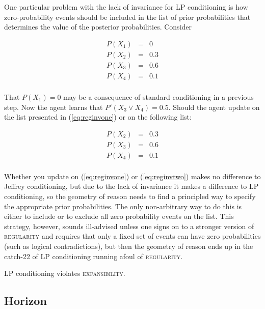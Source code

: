 \documentclass[12pt]{article}
\begin{document}
One particular problem with the lack of invariance for LP conditioning
is how zero-probability events should be included in the list of prior
probabilities that determines the value of the posterior
probabilities. Consider

\begin{equation}
  \label{eq:reginvone}
  \begin{array}{rcl}
  P(X_{1})&=&0\\
  P(X_{2})&=&0.3\\
  P(X_{3})&=&0.6\\
  P(X_{4})&=&0.1\\
\end{array}
\end{equation}

That $P(X_{1})=0$ may be a consequence of standard conditioning in a
previous step. Now the agent learns that $P'(X_{3}\vee{}X_{4})=0.5$.
Should the agent update on the list presented in (\ref{eq:reginvone})
or on the following list:

\begin{equation}
  \label{eq:reginvtwo}
  \begin{array}{rcl}
  P(X_{2})&=&0.3\\
  P(X_{3})&=&0.6\\
  P(X_{4})&=&0.1\\
\end{array}
\end{equation}

Whether you update on (\ref{eq:reginvone}) or (\ref{eq:reginvtwo})
makes no difference to Jeffrey conditioning, but due to the lack of
invariance it makes a difference to LP conditioning, so the geometry
of reason needs to find a principled way to specify the appropriate
prior probabilities. The only non-arbitrary way to do this is either
to include or to exclude all zero probability events on the list. This
strategy, however, sounds ill-advised unless one signs on to a
stronger version of \textsc{regularity} and requires that only a fixed
set of events can have zero probabilities (such as logical
contradictions), but then the geometry of reason ends up in the
catch-22 of LP conditioning running afoul of \textsc{regularity}.

LP conditioning violates \textsc{expansibility}.

\subsection{Horizon}
\label{Horizon}
\end{document}
